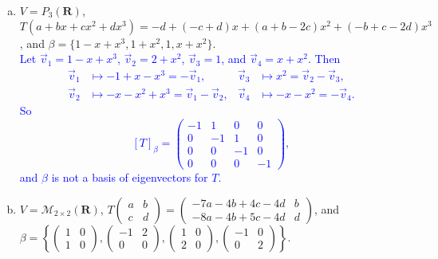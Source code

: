 \documentclass[a4paper,11pt]{article}
\newcommand{\R}{\mathbf{R}}
\newcommand{\M}{\mathcal{M}}
\newcommand{\blue}[1]{\textcolor{blue}{#1}}
\begin{document}
\begin{enumerate}[(a)]
\item $V=P_3(\R)$, $T(a+bx+cx^2+dx^3)=-d+(-c+d)x+(a+b-2c)x^2+(-b+c-2d)x^3$, and
  $\beta=\{1-x+x^3,1+x^2,1,x+x^2\}$. \\

  \blue{Let $\vec v_1=1-x+x^3$, $\vec v_2=2+x^2$, $\vec v_3=1$, and $\vec
    v_4=x+x^2$. Then
    \begin{align*}
      \vec v_1 &\mapsto -1+x-x^3 = -\vec v_1, &
      \vec v_3 &\mapsto x^2 = \vec v_2-\vec v_3, \\
      \vec v_2 &\mapsto -x-x^2+x^3 = \vec v_1-\vec v_2, &
      \vec v_4 &\mapsto -x-x^2 = -\vec v_4.
    \end{align*}
    So 
    \[
      [T]_\beta =
      \left(
        \begin{array}{rrrr}
          -1 & 1 & 0 & 0 \\
          0 & -1 & 1 & 0 \\
          0 & 0 & -1 & 0 \\
          0 & 0 & 0 & -1
        \end{array}
      \right),
    \]
    and $\beta$ is not a basis of eigenvectors for $T$. \\}

\item $V=\M_{2 \times 2}(\R)$,
  $T\left( \begin{smallmatrix}a&b\\c&d\end{smallmatrix} \right)=
  \left( \begin{smallmatrix}-7a-4b+4c-4d & b \\
           -8a-4b+5c-4d & d\end{smallmatrix} \right)$, and
       $\beta = \left\{ \left( \begin{smallmatrix}1&0\\1&0\end{smallmatrix}
         \right),
         \left( \begin{smallmatrix}-1&2\\0&0\end{smallmatrix} \right),
         \left( \begin{smallmatrix}1&0\\2&0\end{smallmatrix} \right),
       \left( \begin{smallmatrix}-1&0\\0&2\end{smallmatrix} \right)\right\}$. \\


\end{enumerate}
\end{document}
